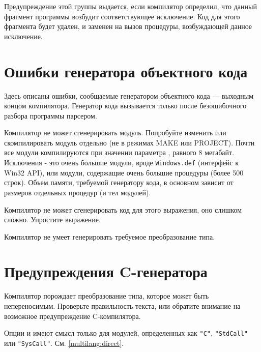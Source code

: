 Предупреждение этой группы выдается, если компилятор определил, что
данный фрагмент программы возбудит соответствующее исключение.
Код для этого фрагмента будет удален, и заменен на вызов процедуры,
возбуждающей данное исключение.

\section{Ошибки генератора объектного кода}

Здесь описаны ошибки, сообщаемые генератором объектного кода --- 
выходным концом компилятора. Генератор кода вызывается только
после безошибочного разбора программы парсером.


Компилятор не может сгенерировать модуль. Попробуйте 
изменить  или скомпилировать модуль отдельно
(не в режимах MAKE или PROJECT).       %
Почти все модули компилируются при значении параметра ,
равного 8 мегабайт.
Исключения - это очень большие модули, вроде \verb'Windows.def' 
(интерфейс к Win32 API), или модули, содержащие очень большие процедуры
(более 500 строк). Объем памяти, требуемой генератору кода, в основном 
зависит от размеров отдельных процедур (и тел модулей). %


Компилятор не может сгенерировать код для этого выражения, оно 
слишком сложно. Упростите выражение.


Компилятор не умеет генерировать требуемое преобразование типа.

\section{Предупреждения C-генератора}


Компилятор порождает преобразование типа, которое может быть
непереносимым. Проверьте правильность текста, или обратите внимание
на возможное предупреждение C-компилятора.


Опции  и  
имеют смысл только для модулей, определенных как
\verb'"C"', \verb'"StdCall"' или \verb'"SysCall"'. 
См. \ref{multilang:direct}.

